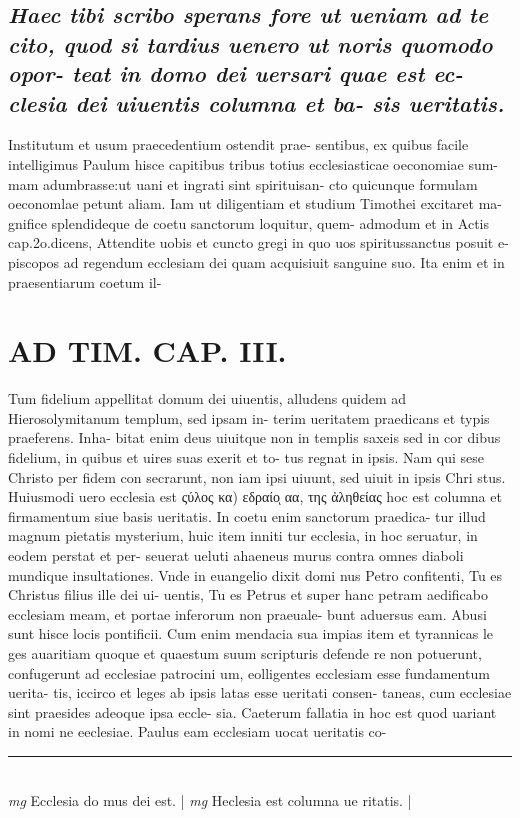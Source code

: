 \documentclass{article}
\begin{document}
\begin{pages}
\subsection*{\textit{Haec tibi scribo sperans fore ut ueniam ad te cito, quod si tardius uenero ut noris quomodo opor- teat in domo dei uersari quae est ec- clesia dei uiuentis columna et ba- sis ueritatis. }}\pstart Institutum et usum praecedentium ostendit prae- sentibus, ex quibus facile intelligimus Paulum hisce capitibus tribus totius ecclesiasticae oeconomiae sum- mam adumbrasse:ut uani et ingrati sint spirituisan- cto quicunque formulam oeconomlae petunt aliam. Iam ut diligentiam et studium Timothei excitaret ma- gnifice splendideque de coetu sanctorum loquitur, quem- admodum et in Actis cap.2o.dicens, Attendite uobis et cuncto gregi in quo uos spiritussanctus posuit e- piscopos ad regendum ecclesiam dei quam acquisiuit sanguine suo. Ita enim et in praesentiarum coetum il-  \pend
\section*{AD TIM. CAP. III. }
\marginpar{[ p.134 ]}\pstart Tum fidelium appellitat domum dei uiuentis, alludens quidem ad Hierosolymitanum templum, sed ipsam in- terim ueritatem praedicans et typis praeferens. Inha- bitat enim deus uiuitque non in templis saxeis sed in cor dibus fidelium, in quibus et uires suas exerit et to- tus regnat in ipsis. Nam qui sese Christo per fidem con secrarunt, non iam ipsi uiuunt, sed uiuit in ipsis Chri stus. Huiusmodi uero ecclesia est ςύλος κα) εδραίοͅ αα, της ἀληθείας hoc est columna et firmamentum siue basis ueritatis. In coetu enim sanctorum praedica- tur illud magnum pietatis mysterium, huic item inniti tur ecclesia, in hoc seruatur, in eodem perstat et per- seuerat ueluti ahaeneus murus contra omnes diaboli mundique insultationes. Vnde in euangelio dixit domi nus Petro confitenti, Tu es Christus filius ille dei ui- uentis, Tu es Petrus et super hanc petram aedificabo ecclesiam meam, et portae inferorum non praeuale- bunt aduersus eam. Abusi sunt hisce locis pontificii. Cum enim mendacia sua impias item et tyrannicas le ges auaritiam quoque et quaestum suum scripturis defende re non potuerunt, confugerunt ad ecclesiae patrocini um, eolligentes ecclesiam esse fundamentum uerita- tis, iccirco et leges ab ipsis latas esse ueritati consen- taneas, cum ecclesiae sint praesides adeoque ipsa eccle- sia. Caeterum fallatia in hoc est quod uariant in nomi ne eeclesiae. Paulus eam ecclesiam uocat ueritatis co-  \pend
\vspace{0.5cm}\noindent
\vspace{0.2cm}\rule{1cm}{0.2pt}\\ 
\hspace{0.2cm}\textit{mg}
\footnotesize Ecclesia do mus dei est. 
\normalsize| 
\hspace{0.2cm}\textit{mg}
\footnotesize Heclesia est columna ue ritatis. 
\normalsize| 

\end{pages}
\end{document}
